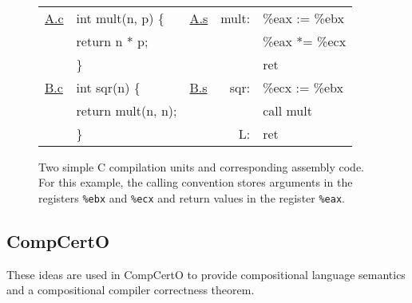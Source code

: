 \begin{figure} %
  \figsize
  \centering
  \tt
  {\footnotesize
  \begin{tabular}{ll lr@{\ }l}
    \hline
    \underline{A.c} & int mult(n, p) \{ &
    \underline{A.s} & mult: & \%eax := \%ebx \\
                    & \quad return n * p; &
                    & & \%eax *= \%ecx \\
                    & \} &
                    & & ret \\
    \hline
    \underline{B.c} & int sqr(n) \{ &
    \underline{B.s} & sqr: & \%ecx := \%ebx \\
                    & \quad return mult(n, n); &
                    & & call mult \\
                    & \} &
                    & L: & ret \\
    \hline
  \end{tabular}
  }
  \caption{Two simple C compilation units and corresponding assembly code.
    For this example,
    the calling convention stores arguments in
    the registers
    \texttt{\%ebx} and \texttt{\%ecx}
    and return values in
    the register
    \texttt{\%eax}.}
  \label{fig:abc}
\end{figure}



\subsection{CompCertO} \label{sec:mainideas:compcerto} %


These ideas are used in CompCertO
to provide compositional language semantics and
a compositional compiler correctness theorem.

